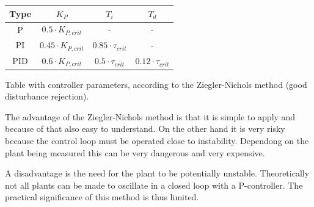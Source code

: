\begin{center}
    \begin{threeparttable}
        \begin{tabular}{cccc}
            \toprule
            Type & $K_{P}$                   &  $T_{i}$                   &  $T_{d}$ \\
            \midrule
            P    &  $0.5  \cdot K_{P,crit}$  &  -                         &  -                         \\
            PI   &  $0.45 \cdot K_{P,crit}$  &  $0.85 \cdot \tau_{crit}$  &  -                         \\
            PID  &  $0.6  \cdot K_{P,crit}$  &  $0.5 \cdot \tau_{crit}$   &  $0.12 \cdot \tau_{crit}$  \\
            \bottomrule
        \end{tabular}
        \caption{Table with controller parameters, according to the Ziegler-Nichols method (good disturbance rejection).}
        \label{tab:ziegler_nichols}
    \end{threeparttable}
\end{center}

The advantage of the Ziegler-Nichols method is  that it is simple to apply and
because of that also easy to understand. On the  other  hand  it is very risky
because the control loop must be operated close to instability.  Dependong  on
the  plant  being  measured  this  can  be  very dangerous and very expensive.

A  disadvantage  is  the  need  for  the  plant to  be  potentially  unstable.
Theoretically not all plants can be made to oscillate in a closed  loop with a
P-controller. The  practical  significance  of  this  method  is thus limited.

